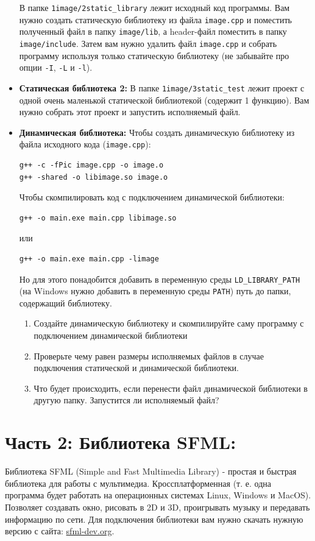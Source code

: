 \documentclass{article}
\begin{document}
\begin{itemize}
\begin{enumerate}
\begin{verbatim}
\end{verbatim}
\end{enumerate}
В папке \texttt{1image/2static\_library} лежит исходный код программы. Вам нужно создать статическую библиотеку из файла \texttt{image.cpp} и поместить полученный файл в папку \texttt{image/lib}, а header-файл поместить в папку \texttt{image/include}. Затем вам нужно удалить файл \texttt{image.cpp} и собрать программу используя только статическую библиотеку (не забывайте про опции \texttt{-I}, \texttt{-L} и \texttt{-l}).
\item \textbf{Статическая библиотека 2:} В папке \texttt{1image/3static\_test} лежит проект с одной очень маленькой статической библиотекой (содержит 1 функцию). Вам нужно собрать этот проект и запустить исполняемый файл.
\item \textbf{Динамическая библиотека:} Чтобы создать динамическую библиотеку из файла исходного кода (\texttt{image.cpp}):
\begin{verbatim}
g++ -c -fPic image.cpp -o image.o
g++ -shared -o libimage.so image.o
\end{verbatim}
Чтобы скомпилировать код с подключением динамической библиотеки:
\begin{verbatim}
g++ -o main.exe main.cpp libimage.so
\end{verbatim}
или
\begin{verbatim}
g++ -o main.exe main.cpp -limage
\end{verbatim}
Но для этого понадобится добавить в переменную среды \texttt{LD\_LIBRARY\_PATH} (на Windows нужно добавить в переменную среды \texttt{PATH}) путь до папки, содержащий библиотеку.
\begin{enumerate}
\item Создайте динамическую библиотеку и скомпилируйте саму программу с подключением динамической библиотеки
\item Проверьте чему равен размеры исполняемых файлов в случае подключения статической и динамической библиотеки.
\item Что будет происходить, если перенести файл динамической библиотеки в другую папку. Запустится ли исполняемый файл?
\end{enumerate}
\end{itemize}

\newpage
\section*{Часть 2: Библиотека SFML:}
Библиотека SFML (Simple and Fast Multimedia Library) - простая и быстрая библиотека для работы с мультимедиа. Кроссплатформенная (т. е. одна программа будет работать на операционных системах Linux, Windows и MacOS). Позволяет создавать окно, рисовать в 2D и 3D, проигрывать музыку и передавать информацию по сети. Для подключения библиотеки вам нужно скачать нужную версию с сайта: \href{https://www.sfml-dev.org/}{sfml-dev.org}.
\end{document}
